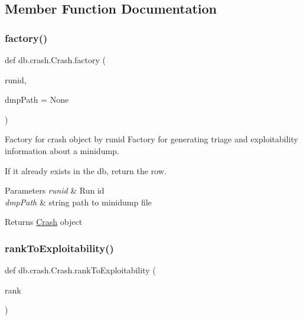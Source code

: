 \subsection{Member Function Documentation}
\mbox{\label{classdb_1_1crash_1_1_crash_affcb78bd66651217927efc4b77e48bd1}} 
\subsubsection{\texorpdfstring{factory()}{factory()}}
{\footnotesize\ttfamily def db.\+crash.\+Crash.\+factory (\begin{DoxyParamCaption}\item[{}]{runid,  }\item[{}]{dmp\+Path = {\ttfamily None} }\end{DoxyParamCaption})\hspace{0.3cm}{\ttfamily [static]}}



Factory for crash object by runid Factory for generating triage and exploitability information about a minidump. 

If it already exists in the db, return the row. 
\begin{DoxyParams}{Parameters}
{\em runid} & Run id \\
\hline
{\em dmp\+Path} & string path to minidump file \\
\hline
\end{DoxyParams}
\begin{DoxyReturn}{Returns}
\mbox{\hyperlink{classdb_1_1crash_1_1_crash}{Crash}} object 
\end{DoxyReturn}
\mbox{\label{classdb_1_1crash_1_1_crash_a2abc936fd748ececc054b54598614a8f}} 
\subsubsection{\texorpdfstring{rank\+To\+Exploitability()}{rankToExploitability()}}
{\footnotesize\ttfamily def db.\+crash.\+Crash.\+rank\+To\+Exploitability (\begin{DoxyParamCaption}\item[{}]{rank }\end{DoxyParamCaption})\hspace{0.3cm}{\ttfamily [static]}}




